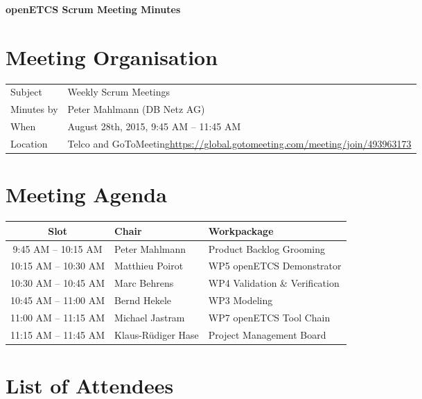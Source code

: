 \documentclass[a4paper, 11pt]{article}
\begin{document}
{\begin{center}\huge\bf openETCS Scrum Meeting Minutes\end{center}}

\section{Meeting Organisation}

\renewcommand{\arraystretch}{1.5}
\begin{supertabular}{m{.2\textwidth}m{.8\textwidth}}
Subject & Weekly Scrum Meetings\\
Minutes by & Peter Mahlmann (DB Netz AG)\\
When & August 28th, 2015, 9:45 AM -- 11:45 AM\\
Location & Telco and GoToMeeting\newline \url{https://global.gotomeeting.com/meeting/join/493963173}\\
\end{supertabular}

\renewcommand{\arraystretch}{1.0}
\section{Meeting Agenda}

\begin{tabular}{cll}
\toprule
\textbf{Slot} &  \textbf{Chair} & \textbf{Workpackage} \\
\midrule 
9:45 AM -- 10:15 AM & Peter Mahlmann & Product Backlog Grooming  \\
10:15 AM -- 10:30 AM & Matthieu Poirot & WP5 openETCS Demonstrator \\  
10:30 AM -- 10:45 AM & Marc Behrens & WP4 Validation \& Verification \\
10:45 AM -- 11:00 AM & Bernd Hekele & WP3 Modeling \\
11:00 AM -- 11:15 AM & Michael Jastram  & WP7 openETCS Tool Chain \\
11:15 AM -- 11:45 AM & Klaus-R\"udiger Hase & Project Management Board \\
\bottomrule
\end{tabular}

\section{List of Attendees}
\end{document}
